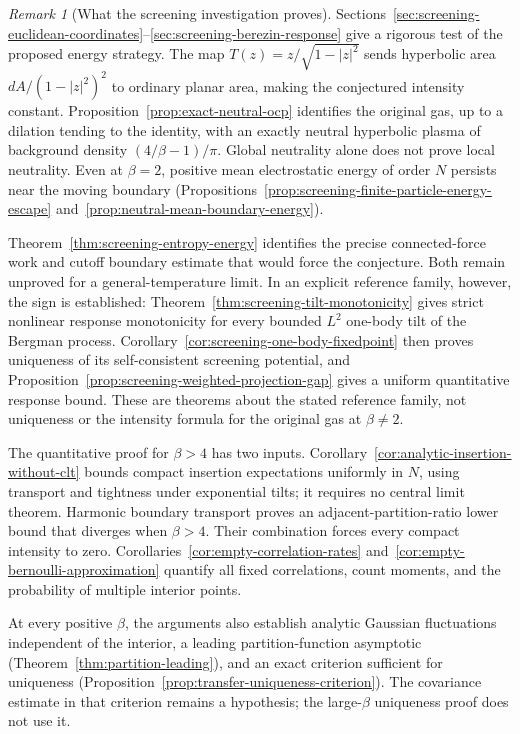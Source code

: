 \documentclass[11pt,a4paper]{article}
\numberwithin{equation}{section}
\theoremstyle{definition}
\theoremstyle{remark}
\newtheorem{remark}[theorem]{Remark}
\begin{document}
\begin{remark}[What the screening investigation proves]
Sections~\ref{sec:screening-euclidean-coordinates}--\ref{sec:screening-berezin-response}
give a rigorous test of the proposed energy strategy. The map
$T(z)=z/\sqrt{1-|z|^2}$ sends hyperbolic area $dA/(1-|z|^2)^2$
to ordinary planar area, making the conjectured intensity constant.
Proposition~\ref{prop:exact-neutral-ocp} identifies the original gas,
up to a dilation tending to the identity, with an exactly neutral
hyperbolic plasma of background density $(4/\beta-1)/\pi$.
Global neutrality alone does not prove local neutrality.
Even at $\beta=2$, positive mean electrostatic energy of order $N$
persists near the moving boundary
(Propositions~\ref{prop:screening-finite-particle-energy-escape}
and~\ref{prop:neutral-mean-boundary-energy}).

Theorem~\ref{thm:screening-entropy-energy} identifies the precise
connected-force work and cutoff boundary estimate that would force
the conjecture. Both remain unproved for a general-temperature limit.
In an explicit reference family, however, the sign is established:
Theorem~\ref{thm:screening-tilt-monotonicity} gives strict nonlinear
response monotonicity for every bounded $L^2$ one-body tilt of the
Bergman process. Corollary~\ref{cor:screening-one-body-fixedpoint}
then proves uniqueness of its self-consistent screening potential,
and Proposition~\ref{prop:screening-weighted-projection-gap} gives
a uniform quantitative response bound. These are theorems about the
stated reference family, not uniqueness or the intensity formula for
the original gas at $\beta\ne2$.
\end{remark}

The quantitative proof for $\beta>4$ has two inputs.
Corollary~\ref{cor:analytic-insertion-without-clt} bounds compact insertion
expectations uniformly in $N$, using transport and tightness under
exponential tilts; it requires no central limit theorem. Harmonic boundary
transport proves an adjacent-partition-ratio lower bound that diverges
when $\beta>4$. Their combination forces every compact intensity to
zero. Corollaries~\ref{cor:empty-correlation-rates}
and~\ref{cor:empty-bernoulli-approximation} quantify all fixed correlations,
count moments, and the probability of multiple interior points.

At every positive $\beta$, the arguments also establish analytic Gaussian
fluctuations independent of the interior, a leading partition-function
asymptotic (Theorem~\ref{thm:partition-leading}), and an exact criterion
sufficient for uniqueness (Proposition~\ref{prop:transfer-uniqueness-criterion}).
The covariance estimate in that criterion remains a hypothesis; the
large-$\beta$ uniqueness proof does not use it.
\end{document}
